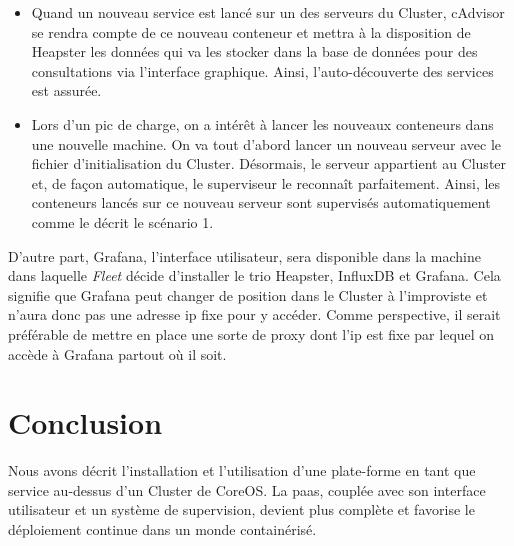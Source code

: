 \begin{onehalfspace}
\begin{itemize}
	\item Quand un nouveau service est lancé sur un des serveurs du Cluster, cAdvisor se rendra compte de ce nouveau conteneur et mettra à la disposition de Heapster les données qui va les stocker dans la base de données pour des consultations via l'interface graphique. Ainsi, l'auto-découverte des services est assurée.
	\item Lors d'un pic de charge, on a intérêt à lancer les nouveaux conteneurs dans une nouvelle machine. On va tout d'abord lancer un nouveau serveur avec le fichier d'initialisation du Cluster. Désormais, le serveur appartient au Cluster et, de façon automatique, le superviseur le reconnaît parfaitement. Ainsi, les conteneurs lancés sur ce nouveau serveur sont supervisés automatiquement comme le décrit le scénario 1.
\end{itemize}

D'autre part, Grafana, l'interface utilisateur, sera disponible dans la machine dans laquelle \emph{Fleet} décide d'installer le trio Heapster, InfluxDB et Grafana. Cela signifie que Grafana peut changer de position dans le Cluster à l'improviste et n'aura donc pas une adresse \acrshort{ip} fixe pour y accéder. Comme perspective, il serait préférable de mettre en place une sorte de proxy dont l'\acrshort{ip} est fixe par lequel on accède à Grafana partout où il soit.


\section*{Conclusion}

Nous avons décrit l'installation et l'utilisation d'une plate-forme en tant que service au-dessus d'un Cluster de CoreOS. La \acrshort{paas}, couplée avec son interface utilisateur et un système de supervision, devient plus complète et favorise le déploiement continue dans un monde containérisé.

\end{onehalfspace}
